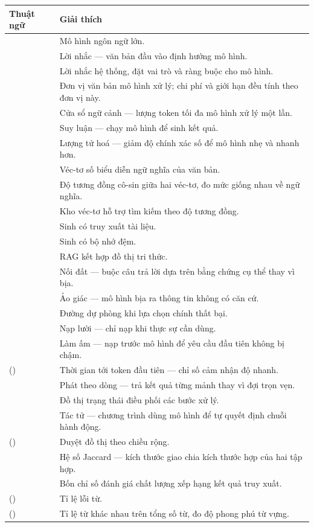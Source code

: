 \begin{longtable}{L{4.2cm} L{9.4cm}}
\toprule
\textbf{Thuật ngữ} & \textbf{Giải thích}\\
\midrule
\endhead
{} & Mô hình ngôn ngữ lớn.\\
 & Lời nhắc — văn bản đầu vào định hướng mô hình.\\
 & Lời nhắc hệ thống, đặt vai trò và ràng buộc cho mô hình.\\
 & Đơn vị văn bản mô hình xử lý; chi phí và giới hạn đều tính theo đơn vị này.\\
 & Cửa sổ ngữ cảnh — lượng token tối đa mô hình xử lý một lần.\\
 & Suy luận — chạy mô hình để sinh kết quả.\\
 & Lượng tử hoá — giảm độ chính xác số để mô hình nhẹ và nhanh hơn.\\
 & Véc-tơ số biểu diễn ngữ nghĩa của văn bản.\\
 & Độ tương đồng cô-sin giữa hai véc-tơ, đo mức giống nhau về ngữ nghĩa.\\
 & Kho véc-tơ hỗ trợ tìm kiếm theo độ tương đồng.\\
 & Sinh có truy xuất tài liệu.\\
 & Sinh có bộ nhớ đệm.\\
 & RAG kết hợp đồ thị tri thức.\\
 & Nối đất — buộc câu trả lời dựa trên bằng chứng cụ thể thay vì bịa.\\
 & Ảo giác — mô hình bịa ra thông tin không có căn cứ.\\
 & Đường dự phòng khi lựa chọn chính thất bại.\\
 & Nạp lười — chỉ nạp khi thực sự cần dùng.\\
 & Làm ấm — nạp trước mô hình để yêu cầu đầu tiên không bị chậm.\\
 () & Thời gian tới token đầu tiên — chỉ số cảm nhận độ nhanh.\\
 & Phát theo dòng — trả kết quả từng mảnh thay vì đợi trọn vẹn.\\
 & Đồ thị trạng thái điều phối các bước xử lý.\\
 & Tác tử — chương trình dùng mô hình để tự quyết định chuỗi hành động.\\
 () & Duyệt đồ thị theo chiều rộng.\\
 & Hệ số Jaccard — kích thước giao chia kích thước hợp của hai tập hợp.\\
 & Bốn chỉ số đánh giá chất lượng xếp hạng kết quả truy xuất.\\
 () & Tỉ lệ lỗi từ.\\
 () & Tỉ lệ từ khác nhau trên tổng số từ, đo độ phong phú từ vựng.\\
\bottomrule
\end{longtable}

